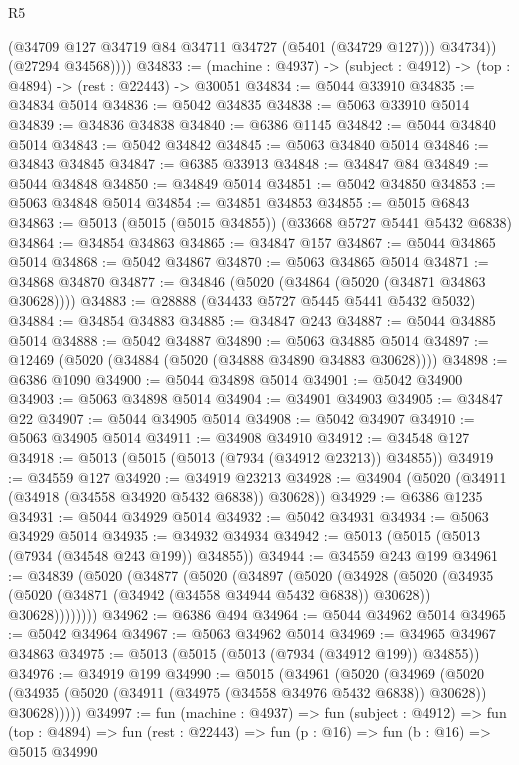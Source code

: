 \begin{lexlean}{R5}
\begin{coremodule}
              (@34709 @127 @34719 @84 @34711 @34727 (@5401 (@34729 @127)))
              @34734))
          (@27294 @34568))))
@34833 := (machine : @4937) -> (subject : @4912) -> (top : @4894) -> (rest : @22443) -> @30051
@34834 := @5044 @33910
@34835 := @34834 @5014
@34836 := @5042 @34835
@34838 := @5063 @33910 @5014
@34839 := @34836 @34838
@34840 := @6386 @1145
@34842 := @5044 @34840 @5014
@34843 := @5042 @34842
@34845 := @5063 @34840 @5014
@34846 := @34843 @34845
@34847 := @6385 @33913
@34848 := @34847 @84
@34849 := @5044 @34848
@34850 := @34849 @5014
@34851 := @5042 @34850
@34853 := @5063 @34848 @5014
@34854 := @34851 @34853
@34855 := @5015 @6843
@34863 := @5013 (@5015 (@5015 @34855)) (@33668 @5727 @5441 @5432 @6838)
@34864 := @34854 @34863
@34865 := @34847 @157
@34867 := @5044 @34865 @5014
@34868 := @5042 @34867
@34870 := @5063 @34865 @5014
@34871 := @34868 @34870
@34877 := @34846 (@5020 (@34864 (@5020 (@34871 @34863 @30628))))
@34883 := @28888 (@34433 @5727 @5445 @5441 @5432 @5032)
@34884 := @34854 @34883
@34885 := @34847 @243
@34887 := @5044 @34885 @5014
@34888 := @5042 @34887
@34890 := @5063 @34885 @5014
@34897 := @12469 (@5020 (@34884 (@5020 (@34888 @34890 @34883 @30628))))
@34898 := @6386 @1090
@34900 := @5044 @34898 @5014
@34901 := @5042 @34900
@34903 := @5063 @34898 @5014
@34904 := @34901 @34903
@34905 := @34847 @22
@34907 := @5044 @34905 @5014
@34908 := @5042 @34907
@34910 := @5063 @34905 @5014
@34911 := @34908 @34910
@34912 := @34548 @127
@34918 := @5013 (@5015 (@5013 (@7934 (@34912 @23213)) @34855))
@34919 := @34559 @127
@34920 := @34919 @23213
@34928 := @34904 (@5020 (@34911 (@34918 (@34558 @34920 @5432 @6838)) @30628))
@34929 := @6386 @1235
@34931 := @5044 @34929 @5014
@34932 := @5042 @34931
@34934 := @5063 @34929 @5014
@34935 := @34932 @34934
@34942 := @5013 (@5015 (@5013 (@7934 (@34548 @243 @199)) @34855))
@34944 := @34559 @243 @199
@34961 := @34839
    (@5020
      (@34877
        (@5020
          (@34897
            (@5020
              (@34928
                (@5020
                  (@34935
                    (@5020 (@34871 (@34942 (@34558 @34944 @5432 @6838)) @30628))
                    @30628))))))))
@34962 := @6386 @494
@34964 := @5044 @34962 @5014
@34965 := @5042 @34964
@34967 := @5063 @34962 @5014
@34969 := @34965 @34967 @34863
@34975 := @5013 (@5015 (@5013 (@7934 (@34912 @199)) @34855))
@34976 := @34919 @199
@34990 := @5015
    (@34961
      (@5020
        (@34969
          (@5020 (@34935 (@5020 (@34911 (@34975 (@34558 @34976 @5432 @6838)) @30628)) @30628)))))
@34997 := fun (machine : @4937) =>
  fun (subject : @4912) =>
  fun (top : @4894) => fun (rest : @22443) => fun (p : @16) => fun (b : @16) => @5015 @34990

\end{coremodule}
\end{lexlean}
